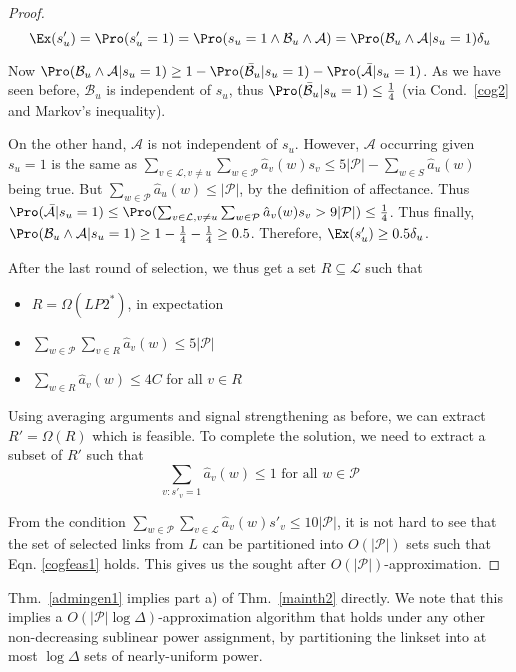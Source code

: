 \documentclass[11pt]{amsart}
\def\calL{{\mathcal L}}
\def\calP{{\mathcal P}}
\begin{document}
\begin{proof}
\[
\Ex(s_u') = \Pro(s'_u = 1) = \Pro(s_u = 1 \land \mathcal{B}_u \land \mathcal{A}) = \Pro(\mathcal{B}_u \land \mathcal{A}|s_u = 1) \delta_u
\]


Now $\Pro(\mathcal{B}_u \land \mathcal{A}|s_u = 1) \geq 1 - \Pro(\bar{ \mathcal{B}}_u |s_u = 1) - \Pro(\bar{\mathcal{A}} |s_u = 1)$. As we have seen before, $\mathcal{B}_u$ is independent of $s_u$, thus $\Pro(\bar{\mathcal{B}}_u |s_u = 1) \leq \frac{1}{4}$ (via  Cond.\ \ref{cog2} and Markov's inequality). 

On the other hand, $\mathcal{A}$ is not independent of $s_u$. However, $\mathcal{A}$ occurring given $s_u = 1$ is the same as  $\sum_{v \in \calL, v \neq u}  \sum_{w \in \calP}\hat{a}_v(w) s_v \leq 5 |\calP| - \sum_{w \in S}\hat{a}_u(w)$ being true. But $\sum_{w \in \calP}\hat{a}_u(w) \leq |\calP|$, by the definition of affectance. Thus $\Pro(\bar{\mathcal{A}} |s_u = 1) \leq \Pro(\sum_{v \in \calL, v \neq u}  \sum_{w \in \calP}\hat{a}_v(w) s_v > 9 |\calP|) \leq \frac{1}{4}$. Thus finally, $\Pro(\mathcal{B}_u \land \mathcal{A}|s_u = 1) \geq 1 - \frac{1}{4} - \frac{1}{4} \geq 0.5$. Therefore, $\Ex(s_u') \geq 0.5 \delta_u$.



After the last round of selection, we thus get a set $R \subseteq \calL$ such that
\begin{itemize}
\item $R = \Omega(LP2^*)$, in expectation
\item $\sum_{w \in \calP} \sum_{v \in R} \hat{a}_v(w) \leq 5 |\calP|$
\item  $\sum_{w \in R} \hat{a}_v(w) \leq 4 C$ for all $v \in R$
\end{itemize}
Using averaging arguments and signal strengthening as before, we can extract $R' = \Omega(R)$ which is feasible.
To complete the solution, we need to extract a subset of $R'$ such that
\begin{equation} 
\sum_{v: s'_v = 1} \hat{a}_v(w) \leq 1 \text{ for all } w \in \calP \label{cogfeas1}
\end{equation} 

From the condition $\sum_{w \in \calP} \sum_{v \in \calL} \hat{a}_v(w) s'_v \leq 10 |\calP|$, it is not hard to see that the set of
selected links from $L$ can be partitioned into $O(|\calP|)$ sets such that Eqn. \ref{cogfeas1} holds. This
gives us the sought after $O(|\calP|)$-approximation.
\end{proof}

Thm.~\ref{admingen1} implies part a) of Thm.~\ref{mainth2} directly.
We note that this implies a $O(|\calP| \log \Delta)$-approximation 
algorithm that holds under any other
non-decreasing sublinear power assignment, by partitioning the
linkset into at most $\log \Delta$ sets of nearly-uniform power.
\end{document}

